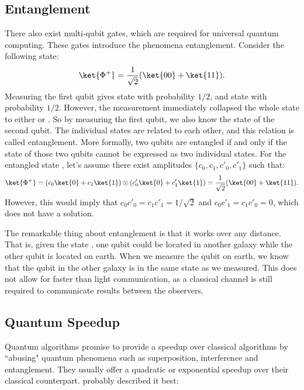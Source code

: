 \documentclass[a4paper,10pt]{article}
\begin{document}
\subsection{Entanglement} \label{sec:entanglement}
There also exist multi-qubit gates, which are required for universal quantum computing.
These gates introduce the phenomena entanglement.
Consider the following state:
\begin{equation}
\ket{\Phi^+} = \dfrac{1}{\sqrt2}(\ket{00} + \ket{11}).
\end{equation}
Measuring the first qubit gives state  with probability $1/2$, and state  with probability $1/2$.
However, the measurement immediately collapsed the whole state to either  or .
So by measuring the first qubit, we also know the state of the second qubit.
The individual states are related to each other, and this relation is called entanglement.
More formally, two qubits are entangled if and only if the state of those two qubits cannot be expressed as two individual states.
For the entangled state \ket{\Phi^+}, let's assume there exist amplitudes $\{c_0,c_1,c'_0, c'_1\}$ such that:
\begin{equation}
\ket{\Phi^+} = (c_0\ket{0} + c_1\ket{1}) \otimes (c'_0\ket{0} + c'_1\ket{1}) = \dfrac{1}{\sqrt2}(\ket{00} + \ket{11}).
\end{equation}
However, this would imply that $c_0c'_0 = c_1c'_1 = 1/\sqrt2$ and $c_0c'_1 = c_1c'_0 = 0$, which does not have a solution.

The remarkable thing about entanglement is that it works over any distance.
That is, given the state \ket{\Phi^+}, one qubit could be located in another galaxy while the other qubit is located on earth.
When we measure the qubit on earth, we know that the qubit in the other galaxy is in the same state as we measured.
This does not allow for faster than light communication, as a classical channel is still required to communicate results between the observers.

\subsection{Quantum Speedup}
Quantum algorithms promise to provide a speedup over classical algorithms by ``abusing" quantum phenomena such as superposition, interference and entanglement.
They usually offer a quadratic or exponential speedup over their classical counterpart.
\cite{scott-aaronson-qc} probably described it best:
\end{document}
